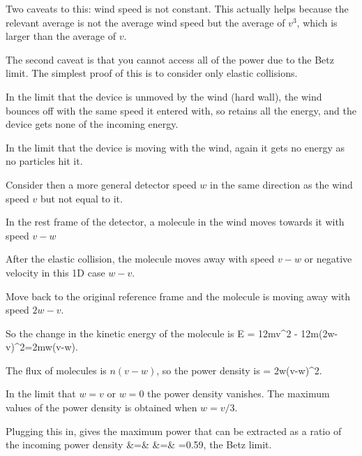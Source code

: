 \documentclass[11pt]{book}
\begin{document}
Two caveats to this: wind speed is not constant. This actually helps because the relevant average is not the average wind speed but the average of $v^3$, which is larger than the average of $v$. 

The second caveat is that you cannot access all of the power due to the Betz limit. The simplest proof of this is to consider only elastic collisions.
\bei
\item In the limit that the device is unmoved by the wind (hard wall), the wind bounces off with the same speed it entered with, so retains all the energy, and the device gets none of the incoming energy.
\item In the limit that the device is moving with the wind, again it gets no energy as no particles hit it.
\item Consider then a more general detector speed $w$ in the same direction as the wind speed $v$ but not equal to it.
\item In the rest frame of the detector, a molecule in the wind moves towards it with speed $v-w$
\item After the elastic collision, the molecule moves away with speed $v-w$ or negative velocity in this 1D case $w-v$. 
\item Move back to the original reference frame and the molecule is moving away with speed $2w-v$.
\item So the change in the kinetic energy of the molecule is 
\be
\Delta E = \frac12mv^2 - \frac12m(2w-v)^2=2mw(v-w).\ee
\item The flux of molecules is $n(v-w)$, so the power density is
\be
{} = 2\rho w(v-w)^2.\ee
\item In the limit that $w=v$ or $w=0$ the power density vanishes. The maximum values of the power density is obtained when $w=v/3$. 
\item Plugging this in, gives the maximum power that can be extracted as a ratio of the incoming power density
\bea
{} &=& 
\vs
&=&
=0.59,
\eea
the Betz limit.
\eei


\end{document}

